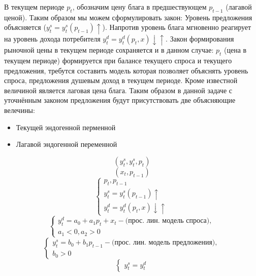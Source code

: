 \documentclass[12pt,a4paper]{article}
\begin{document}
В текущем периоде $p_t$, обозначим цену блага в предшествующем $p_{t-1}$ (лагавой ценой). Таким образом мы можем сформулировать закон: Уровень предложения объясняется ($y_t^s = y_t^s(p_{t-1})\uparrow$). Напротив уровень блага мгновенно реагирует на уровень дохода потребителя $y_t^d = y_t^d(p_t, x)\downarrow \uparrow$. Закон формирования рыночной цены в текущем периоде сохраняется и в данном случае: $p_t$ (цена в текущем периоде) формируется при балансе текущего спроса и текущего предложения, требутся составить модель которая позволяет объяснять уровень спроса, предложения душевым доход в текущем периоде. Кроме известной величиной является лаговая цена блага. Таким образом в данной задаче с уточнённым законом предложения будут присутствовать две объясняющие велечины:
\begin{itemize}
\item Текущей эндогенной перменной
\item Лагавой эндогенной переменной
\end{itemize}
\begin{equation}
(y_t^s, y_t^s, p_t)
\end{equation}
\begin{equation}
(x_t, p_{t - 1})
\end{equation}
\begin{equation}
\begin{cases}
p_t, p_{t-1} \\
y_t^s = y_t^s(p_{t-1})\uparrow \\
y_t^d = y_t^d(p_t, x)\downarrow \uparrow
\end{cases}
\end{equation}
\begin{equation}
\begin{cases}
y_t^d = a_0 + a_1 p_t + x_t - \text{(прос. лин. модель спроса)}, \\
a_1 < 0, a_2 > 0
\end{cases}
\end{equation}
\begin{equation}
\begin{cases}
y_t^s = b_0 + b_1 p_{t - 1} - \text{(прос. лин. модель предложения)}, \\
b_0 > 0
\end{cases}
\end{equation}
\begin{equation}
\begin{cases}
y_t^s = y_t^d
\end{cases}
\end{equation}
\end{document}
